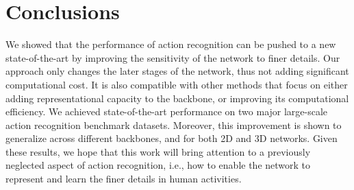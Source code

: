 \documentclass[10pt,twocolumn,letterpaper]{article}
\begin{document}
\section{Conclusions}
We showed that the performance of action recognition can be pushed to a new state-of-the-art by improving the sensitivity of the network to finer details. Our approach only changes the later stages of the network, thus not adding significant computational cost. It is also compatible with other methods that focus on either adding representational capacity to the backbone, or improving its computational efficiency. We achieved state-of-the-art performance on two major large-scale action recognition benchmark datasets. Moreover, this improvement is shown to generalize across different backbones, and for both 2D and 3D networks. Given these results, we hope that this work will bring attention to a previously neglected aspect of action recognition, i.e., how to enable the network to represent and learn the finer details in human activities.


{\small


}
\end{document}
